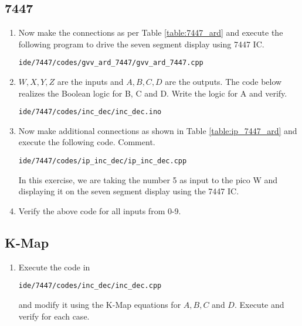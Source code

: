 \documentclass[journal]{IEEEtran}
\begin{document}
\subsection{7447}
\begin{enumerate}[label=\arabic*.,ref=\theenumi]
\item
Now make the connections as per Table \ref{table:7447_ard}  and execute the following program to drive the seven segment display using 7447 IC. 
\begin{lstlisting}
ide/7447/codes/gvv_ard_7447/gvv_ard_7447.cpp
\end{lstlisting}

\begin{table}[H]
\centering

\caption{}
\label{table:7447_ard}
\end{table}

% 
\item
 $W,X,Y,Z$ are the inputs
and $A,B,C,D$ are the outputs. The code below realizes the Boolean logic for B, C and D.  Write the logic for A and verify.
\begin{lstlisting}
ide/7447/codes/inc_dec/inc_dec.ino
\end{lstlisting}

\item
Now make additional connections as shown in Table \ref{table:ip_7447_ard} and execute the following code.  Comment.
%			
\begin{lstlisting}
ide/7447/codes/ip_inc_dec/ip_inc_dec.cpp
\end{lstlisting}

\solution
In this exercise, we are taking the number 5 as input to the pico W and displaying it on the seven segment display using the 7447 IC.
\begin{table}[H]
\centering

\caption{}
\label{table:ip_7447_ard}
\end{table}
\item
Verify the above code for all inputs from 0-9.
\end{enumerate}
\subsection{K-Map}
\begin{enumerate}[label=\arabic*.,ref=\theenumi]
\item Execute the code in
\begin{lstlisting}
ide/7447/codes/inc_dec/inc_dec.cpp
\end{lstlisting}
%
and modify it using the K-Map equations for $A,B,C$ and $D$. Execute and verify for each case.
\end{enumerate}
\end{document}
